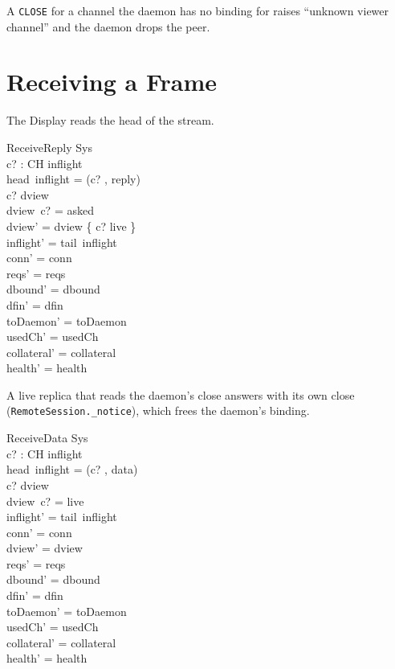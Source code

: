 \documentclass[a4paper,10pt,fleqn]{article}
\begin{document}
A \texttt{CLOSE} for a channel the daemon has no binding for raises
``unknown viewer channel'' and the daemon drops the peer.

\section{Receiving a Frame}

The Display reads the head of the stream.

\begin{schema}{ReceiveReply}
  \Delta Sys \\
  c? : CH
\where
  inflight \neq \langle \rangle \\
  head~inflight = (c? , reply) \\
  c? \in \dom dview \\
  dview~c? = asked \\
  dview' = dview \oplus \{ c? \mapsto live \} \\
  inflight' = tail~inflight \\
  conn' = conn \\
  reqs' = reqs \\
  dbound' = dbound \\
  dfin' = dfin \\
  toDaemon' = toDaemon \\
  usedCh' = usedCh \\
  collateral' = collateral \\
  health' = health
\end{schema}

A live replica that reads the daemon's close answers with its own close (\texttt{RemoteSession.\_notice}), which frees the daemon's binding.



\begin{schema}{ReceiveData}
  \Delta Sys \\
  c? : CH
\where
  inflight \neq \langle \rangle \\
  head~inflight = (c? , data) \\
  c? \in \dom dview \\
  dview~c? = live \\
  inflight' = tail~inflight \\
  conn' = conn \\
  dview' = dview \\
  reqs' = reqs \\
  dbound' = dbound \\
  dfin' = dfin \\
  toDaemon' = toDaemon \\
  usedCh' = usedCh \\
  collateral' = collateral \\
  health' = health
\end{schema}
\end{document}
